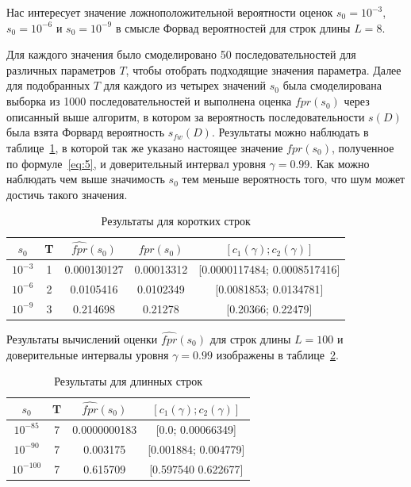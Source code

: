 \documentclass[specialist,
substylefile = spbu_report.rtx,
subf,href,colorlinks=true, 12pt]{disser}
\begin{document}
			Нас интересует значение ложноположительной вероятности оценок $s_{0}=10^{-3}$, $s_{0}=10^{-6}$ и $s_{0}=10^{-9}$ в смысле Форвад вероятностей для строк длины $L=8$.
			
			Для каждого значения было смоделировано 50 последовательностей для различных параметров $T$, чтобы отобрать подходящие значения параметра. Далее для подобранных $T$ для каждого из четырех значений $s_{0}$ была смоделирована выборка из 1000 последовательностей и выполнена оценка $\widehat{fpr}(s_{0})$ через описанный выше алгоритм, в котором за вероятность последовательности $s(D)$ была взята Форвард вероятность $s_{fw}(D)$. Результаты можно наблюдать в таблице~\ref{tb:1}, в которой так же указано настоящее значение $fpr(s_0)$, полученное по формуле~\eqref{eq:5}, и доверительный интервал уровня $\gamma = 0.99$. Как можно наблюдать чем выше значимость $s_{0}$ тем меньше вероятность того, что шум может достичь такого значения.
			\begin{table}
				\centering
				\caption{Результаты для коротких строк} \label{tb:1}
				\begin{tabular}{ccccc}
					$s_{0}$&T&$\widehat{fpr}(s_{0})$&$fpr(s_{0})$&$[c_{1}(\gamma);c_{2}(\gamma)]$  \\ \hline
					$10^{-3}$&1&0.000130127&0.00013312&[0.0000117484; 0.0008517416] \\
					$10^{-6}$&2&0.0105416&0.0102349&[0.0081853; 0.0134781] \\
					$10^{-9}$&3&0.214698&0.21278&[0.20366; 0.22479] \\					
				\end{tabular}
			\end{table}						
						
			 Результаты вычислений оценки $\widehat{fpr}(s_{0})$ для строк длины $L=100$ и доверительные интервалы уровня $\gamma = 0.99$ изображены в таблице~\ref{tb:2}.			 
			 
			 \begin{table}[H]
			 	\centering
			 	\caption{Результаты для длинных строк} \label{tb:2}
			 	\begin{tabular}{cccc}
			 		$s_{0}$&T&$\widehat{fpr}(s_{0})$&$[c_{1}(\gamma);c_{2}(\gamma)]$  \\ \hline
			 		$10^{-85}$&7&0.0000000183&[0.0; 0.00066349] \\
			 		$10^{-90}$&7&0.003175&[0.001884; 0.004779] \\ 
			 		$10^{-100}$&7&0.615709&[0.597540 0.622677] \\
			 	\end{tabular}
			 \end{table}
		 
			
			
			
			\nocite{Stamp2021}
			\nocite{Jurafsky2021}
			\nocite{Rabiner1989}
			\nocite{Newberg2008}
			\renewcommand{\refname}{}
			\vspace{-25pt}
			
			
						
\end{document}
